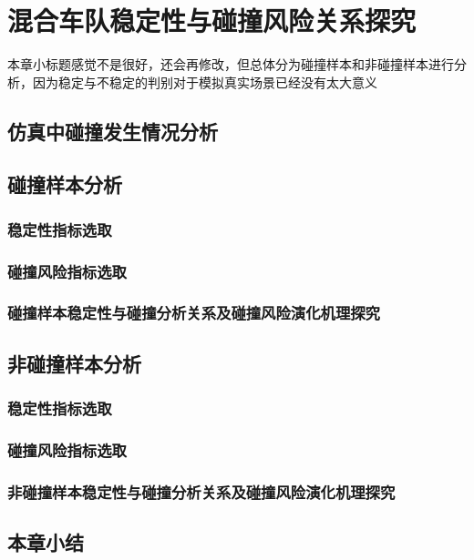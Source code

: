 
\chapter{混合车队稳定性与碰撞风险关系探究}

本章小标题感觉不是很好，还会再修改，但总体分为碰撞样本和非碰撞样本进行分析，因为稳定与不稳定的判别对于模拟真实场景已经没有太大意义

\section{仿真中碰撞发生情况分析}

\section{碰撞样本分析}

\subsection{稳定性指标选取}

\subsection{碰撞风险指标选取}

\subsection{碰撞样本稳定性与碰撞分析关系及碰撞风险演化机理探究}

\section{非碰撞样本分析}

\subsection{稳定性指标选取}

\subsection{碰撞风险指标选取}

\subsection{非碰撞样本稳定性与碰撞分析关系及碰撞风险演化机理探究}

\section{本章小结}